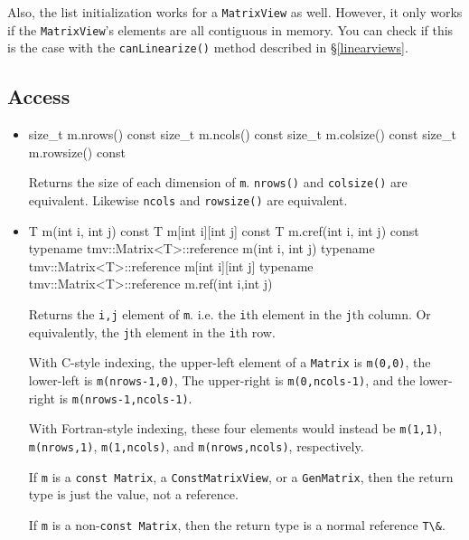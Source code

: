\documentclass[twoside,letterpaper,11pt]{article}
\renewcommand{\tt}[1]{{\lstinline {#1}}}
\begin{document}
Also, the list initialization works for a \tt{MatrixView} as well.  However, it only works
if the \tt{MatrixView}'s elements are all contiguous in memory.  You can check
if this is the case with the \tt{canLinearize()} method described in \S\ref{linearviews}.

\subsection{Access}

\begin{itemize}
\item
\begin{tmvcode}
size_t m.nrows() const
size_t m.ncols() const
size_t m.colsize() const
size_t m.rowsize() const
\end{tmvcode}
Returns the size of each dimension of \tt{m}.  \tt{nrows()} and \tt{colsize()} are equivalent.
Likewise \tt{ncols} and \tt{rowsize()} are equivalent.

\item
\begin{tmvcode}
T m(int i, int j) const
T m[int i][int j] const
T m.cref(int i, int j) const
typename tmv::Matrix<T>::reference m(int i, int j)
typename tmv::Matrix<T>::reference m[int i][int j]
typename tmv::Matrix<T>::reference m.ref(int i,int j)
\end{tmvcode}
Returns the \tt{i,j} element of \tt{m}. i.e. the \tt{i}th element in the 
\tt{j}th column.  Or
equivalently, the \tt{j}th element in the \tt{i}th row. 

With C-style indexing, the upper-left element
of a \tt{Matrix} is \tt{m(0,0)}, the lower-left is \tt{m(nrows-1,0)},
The upper-right is \tt{m(0,ncols-1)}, and the lower-right is
\tt{m(nrows-1,ncols-1)}.

With Fortran-style indexing, these four elements would instead be
\tt{m(1,1)}, \tt{m(nrows,1)}, \tt{m(1,ncols)}, and \tt{m(nrows,ncols)},
respectively.

If \tt{m} is a 
\tt{const Matrix}, a \tt{ConstMatrixView}, or a \tt{GenMatrix}, 
then the return type is just the value, not a reference.

If \tt{m} is a 
non-\tt{const Matrix}, then the return type is a normal reference \tt{T\&}.


\end{itemize}
\end{document}
